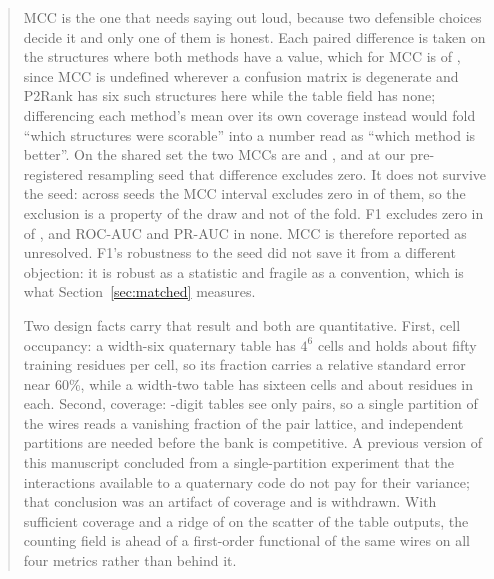 \documentclass[11pt]{article}
\begin{document}
\begin{abstract}
MCC is the one that needs saying out loud, because two defensible choices decide
it and only one of them is honest. Each paired difference is taken on the
structures where both methods have a value, which for MCC is \TabMccNPaired{} of
\NUnits{}, since MCC is undefined wherever a confusion matrix is degenerate and
P2Rank has six such structures here while the table field has none; differencing
each method's mean over its own coverage instead would fold ``which structures
were scorable'' into a number read as ``which method is better''. On the shared
set the two MCCs are \TabMccMatched{} and \TabMccMatchedBase{}, and at our
pre-registered resampling seed that difference excludes zero. It does not
survive the seed: across \NSeedProbes{} seeds the MCC interval excludes zero in
\TabMccSeedSig{} of them, so the exclusion is a property of the draw and not of
the fold. F1 excludes zero in \TabFOneSeedSig{} of \NSeedProbes{}, and ROC-AUC
and PR-AUC in none. MCC is therefore reported as unresolved. F1's robustness to
the seed did not save it from a different objection: it is robust as a statistic
and fragile as a convention, which is what Section~\ref{sec:matched} measures.

Two design facts carry that result and both are quantitative. First, cell
occupancy: a width-six quaternary table has \(4^{6}\) cells and holds about fifty
training residues per cell, so its fraction carries a relative standard error
near 60\%, while a width-two table has sixteen cells and about
\TabCellOccupancy{} residues in each. Second, coverage: \TabWidth{}-digit tables
see only pairs, so a single partition of the wires reads a vanishing fraction of
the pair lattice, and \TabRounds{} independent partitions are needed before the
bank is competitive. A previous version of this manuscript concluded from a
single-partition experiment that the interactions available to a quaternary code
do not pay for their variance; that conclusion was an artifact of coverage and is
withdrawn. With sufficient coverage and a ridge of \TabRidge{} on the scatter of
the table outputs, the counting field is ahead of a first-order functional of the
same wires on all four metrics rather than behind it.


\end{abstract}
\end{document}
